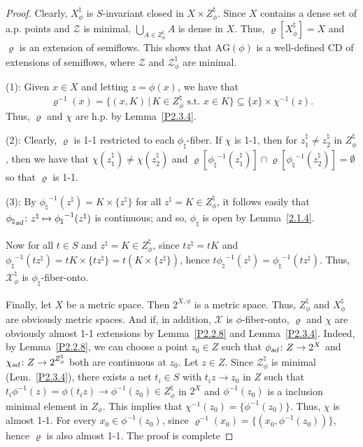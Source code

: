 \documentclass[12pt,final,3p,times]{elsarticle}
\theoremstyle{definition}
\numberwithin{equation}{section}
\begin{document}
\begin{proof}
Clearly, $X_\phi^\natural$ is $S$-invariant closed in $X\times Z_\phi^\natural$. Since $X$ contains a dense set of a.p. points and $\mathscr{Z}$ is minimal, $\bigcup_{A\in Z_\phi^\natural}A$ is dense in $X$. Thus, $\varrho[X_\phi^\natural]=X$ and $\varrho$ is an extension of semiflows. This shows that $\mathrm{AG}(\phi)$ is a well-defined CD of extensions of semiflows, where $\mathscr{Z}$ and $\mathscr{Z}_\phi^\natural$ are minimal.

(1): Given $x\in X$ and letting $z=\phi (x)$, we have that
$$
\varrho^{-1}(x)=\{(x,K)\,|\,K\in Z_\phi^\natural\textrm{ s.t. }x\in K\}\subseteq\{x\}\times\chi^{-1}(z).
$$
Thus, $\varrho$ and $\chi$ are h.p. by Lemma~\ref{P2.3.4}. 

(2): Clearly, $\varrho$ is 1-1 restricted to each $\phi_\natural$-fiber. If $\chi$ is 1-1, then for $z_1^\natural\not=z_2^\natural$ in $Z_\phi^\natural$, then we have that $\chi(z_1^\natural)\not=\chi(z_2^\natural)$ and $\varrho[{\phi_\natural}^{-1}(z_1^\natural)]\cap\varrho[{\phi_\natural}^{-1}(z_2^\natural)]=\emptyset$ so that $\varrho$ is 1-1.

(3): By ${\phi_\natural}^{-1}(z^\natural)=K\times\{z^\natural\}$ for all $z^\natural=K\in Z_\phi^\natural$, it follows easily that ${\phi_\natural}_\textsl{ad}\colon z^\natural\mapsto{\phi_\natural}^{-1}(z^\natural)$ is continuous; and so, $\phi_\natural$ is open by Lemma~\ref{2.1.4}. 

Now for all $t\in S$ and $z^\natural=K\in Z_\phi^\natural$, since $tz^\natural=tK$ and ${\phi_\natural}^{-1}(tz^\natural)=tK\times\{tz^\natural\}=t(K\times
\{z^\natural\})$, hence $t{\phi_\natural}^{-1}(z^\natural)={\phi_\natural}^{-1}(tz^\natural)$. Thus, $\mathscr{X}_\phi^\natural$ is $\phi_\natural$-fiber-onto.

Finally, let $X$ be a metric space. Then $2^{X,\phi}$ is a metric space. Thus, $Z_\phi^\natural$ and $X_\phi^\natural$ are obviously metric spaces. 
And if, in addition, $\mathscr{X}$ is $\phi$-fiber-onto, $\varrho$ and $\chi$ are obviously almost 1-1 extensions by Lemma~\ref{P2.2.8} and Lemma~\ref{P2.3.4}. Indeed, by Lemma~\ref{P2.2.8}, we can choose a point $z_0\in Z$ such that $\phi_\textsl{ad}\colon Z\rightarrow2^X$ and $\chi_\textsl{ad}\colon Z\rightarrow2^{Z_\phi^\natural}$ both are continuous at $z_0$. Let $z\in Z$. Since $\mathscr{Z}_\phi^\natural$ is minimal (Lem.~\ref{P2.3.4}), there exists a net $t_i\in S$ with $t_iz\to z_0$ in $Z$ such that 
$t_i\phi^{-1}(z)=\phi(t_iz)\to\phi^{-1}(z_0)\in Z_\phi^\natural$ in $2^X$ and $\phi^{-1}(z_0)$ is a inclusion minimal element in $Z_\phi$. This implies that $\chi^{-1}(z_0)=\{\phi^{-1}(z_0)\}$. Thus, $\chi$ is almost 1-1. For every $x_0\in\phi^{-1}(z_0)$, since $\varrho^{-1}(x_0)=\{(x_0,\phi^{-1}(z_0))\}$, hence $\varrho$ is also almost 1-1.
The proof is complete
\end{proof}
\end{document}
